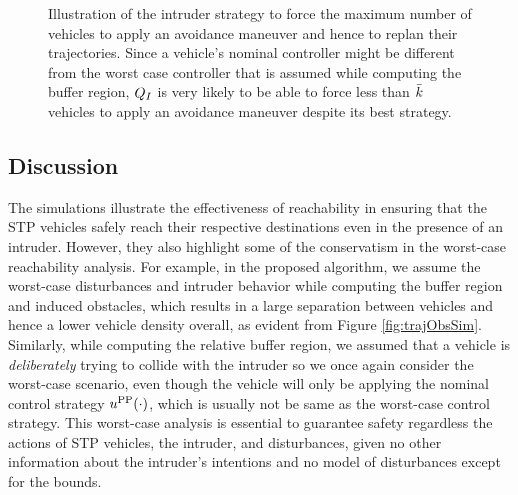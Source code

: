 \begin{figure}
\begin{subfigure}{.5\columnwidth}
  \subcaption{}
  \label{fig:normalcase3}
\end{subfigure}%
\caption{Illustration of the intruder strategy to force the maximum number of vehicles to apply an avoidance maneuver and hence to replan their trajectories. Since a vehicle's nominal controller might be different from the worst case controller that is assumed while computing the buffer region, $Q_{I}$ is very likely to be able to force less than $\bar{k}$ vehicles to apply an avoidance maneuver despite its best strategy.}
\label{fig:normalcase}
\end{figure}         

\subsection{Discussion \label{sec:discuss}}
The simulations illustrate the effectiveness of reachability in ensuring that the STP vehicles safely reach their respective destinations even in the presence of an intruder. However, they also highlight some of the conservatism in the worst-case reachability analysis. For example, in the proposed algorithm, we assume the worst-case disturbances and intruder behavior while computing the buffer region and induced obstacles, which results in a large separation between vehicles and hence a lower vehicle density overall, as evident from Figure \ref{fig:trajObsSim}. Similarly, while computing the relative buffer region, we assumed that a vehicle is \textit{deliberately} trying to collide with the intruder so we once again consider the worst-case scenario, even though the vehicle will only be applying the nominal control strategy $u^{\text{PP}}(\cdot)$, which is usually not be same as the worst-case control strategy. This worst-case analysis is essential to guarantee safety regardless the actions of STP vehicles, the intruder, and disturbances, given no other information about the intruder's intentions and no model of disturbances except for the bounds. 